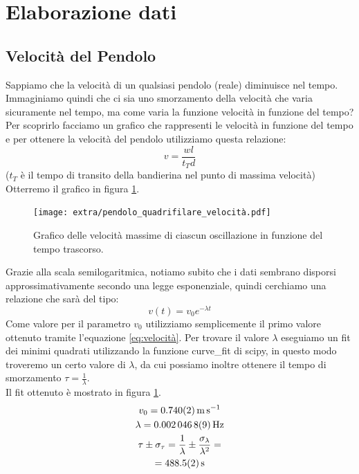 \documentclass{article}
\begin{document}
    
\section{Elaborazione dati}

    \subsection{Velocità del Pendolo}
    Sappiamo che la velocità di un qualsiasi pendolo (reale) diminuisce nel tempo. Immaginiamo quindi che ci sia uno smorzamento della velocità che varia sicuramente nel tempo, ma come varia la funzione velocità in funzione del tempo? 
    Per scoprirlo facciamo un grafico che rappresenti le velocità in funzione del tempo e per ottenere la velocità del pendolo utilizziamo questa relazione:
    \begin{equation}\label{eq:velocità}
        v = \frac{w l}{t_T d}
    \end{equation}
    ($t_T$ è il tempo di transito della bandierina nel punto di massima velocità)
    Otterremo il grafico in figura \ref{fig:pendolo_quadrifilare_velocità}.\\
    \begin{figure}[ht!]
        \centering
        \texttt{[image: extra/pendolo\_quadrifilare\_velocità.pdf]}
        \caption{Grafico delle velocità massime di ciascun oscillazione in funzione del
        tempo trascorso.}
        \label{fig:pendolo_quadrifilare_velocità}
    \end{figure}
    Grazie alla scala semilogaritmica, notiamo subito che i dati sembrano disporsi approssimativamente secondo una legge esponenziale, quindi cerchiamo una relazione che sarà del tipo:
    \begin{equation}
            v(t) = v_0 e^{-\lambda t}
    \end{equation}
    Come valore per il parametro $v_0$ utilizziamo semplicemente il primo valore ottenuto tramite l'equazione \ref{eq:velocità}.
    Per trovare il valore $\lambda$ eseguiamo un fit dei minimi quadrati utilizzando
    la funzione curve\_fit di scipy, in questo modo troveremo un certo valore di $\lambda$,
    da cui possiamo inoltre ottenere il tempo di smorzamento $\tau = \frac{1}{\lambda}$.\\
    Il fit ottenuto è mostrato in figura \ref{fig:pendolo_quadrifilare_velocità}.
    \begin{gather*}
        v_0 = \SI{0.740 \pm 0.002}{\m\per\s} \\
        \lambda = \SI{0.0020468 \pm 0.0000009}{\Hz}  \\
        \tau \pm \sigma_{\tau}= \frac{1}{\lambda}\pm \frac{\sigma_{\lambda}}{\lambda^2}=\\
        =\SI{488.5\pm 0.2}{\s}
    \end{gather*}
\end{document}
